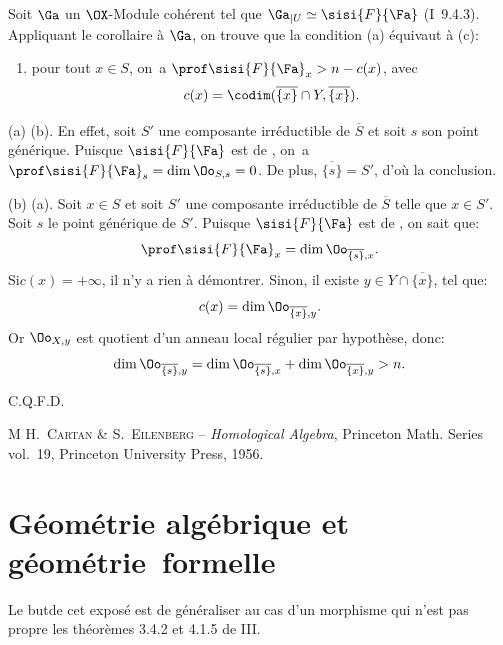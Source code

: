 Soit ${\Ga}$ un $\OX$-Module coh\'erent tel que ${\Ga}{}_{|U}\simeq \sisi{F}{{\Fa}}$ (\EGA I~9.4.3). Appliquant le corollaire  \`a ${\Ga}$, on trouve que la condition (a) \'equivaut \`a (c):
\begin{enumerate}
\item[(c)]
pour tout $x\in S$, on~a $\prof \sisi{F}{{\Fa}}_x>n-c(x)$, avec
\[c(x)=\codim(\overline{\{x\}}\cap Y, \overline{\{x\}}).
\]
\end{enumerate}

(a) \ALORS (b). En effet, soit $S'$ une composante irr\'eductible de $\overline S$ et soit $s$ son point g\'en\'erique. Puisque $\sisi{F}{{\Fa}}$ est de , on~a $\prof \sisi{F}{{\Fa}}_s=\dim \Oo_{S, s}=0$. De plus, $\overline{\{s\}}=S'$, d'o\`u la conclusion.

(b) \ALORS (a). Soit $x\in S$ et soit $S'$ une composante irr\'eductible de $\overline{S}$ telle que $x\in S'$. Soit $s$ le point g\'en\'erique de $S'$. Puisque $\sisi{F}{{\Fa}}$ est de , on sait que:
\[
\prof \sisi{F}{{\Fa}}_x=\dim \Oo_{\overline{\{s\}}, x}.
\]
Si\pageoriginale $c(x)=+\infty$, il n'y a rien \`a d\'emontrer. Sinon, il existe $y\in Y\cap \overline{\{x\}}$, tel que:
\[c(x)=\dim \Oo_{\overline{\{x\}}, y}.
\]
Or $\Oo_{X, y}$ est quotient d'un anneau local r\'egulier par hypoth\`ese, donc:
\[
\dim \Oo_{\overline{\{s\}}, y}=\dim \Oo_{\overline{\{s\}}, x} +\dim \Oo_{\overline{\{x\}}, y}>n.
\]
\begin{flushright}C.Q.F.D.\end{flushright}

\begin{thebibliography}{M}
{\textsc{H.~Cartan \& S.~Eilenberg} -- \emph{Homological Algebra}, Princeton Math. Series vol.~19, Princeton University Press, 1956.}
\end{thebibliography}

\chapter{G\'eom\'etrie alg\'ebrique et g\'eom\'etrie~formelle} \label{IX}

\newcommand{\Ib}{\Ii'}
\newcommand{\Jb}{\sisi{\mathcal J}{\mathcal{J}}}

Le but\pageoriginale de cet expos\'e est de g\'en\'eraliser au cas d'un morphisme qui n'est pas propre les th\'eor\`emes 3.4.2 et 4.1.5 de \EGA III.

